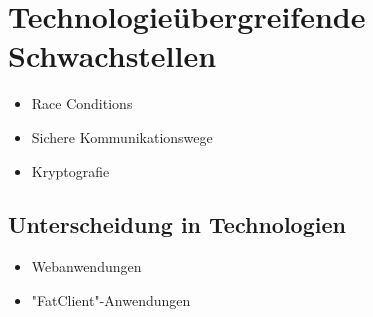 \section{Technologieübergreifende Schwachstellen}


\begin{itemize}
   \item Race Conditions
   \item Sichere Kommunikationswege
   \item Kryptografie
\end{itemize}


\subsection{Unterscheidung in Technologien}

\begin{itemize}
   \item Webanwendungen
   \item "FatClient"-Anwendungen
\end{itemize}


